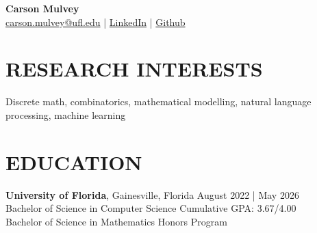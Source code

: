 \documentclass[a4paper,9pt]{extarticle}
\begin{document}
\pagestyle{fancy}
\renewcommand{\headrulewidth}{0pt}
\fancyhead{}
\thispagestyle{empty} %

\begin{flushleft}
\textbf{\LARGE Carson Mulvey}\\[2pt] %
\href{mailto:carson.mulvey@ufl.edu}{carson.mulvey@ufl.edu} | \href{https://www.linkedin.com/in/carson-mulvey}{LinkedIn} | \href{https://github.com/heyuncle}{Github} %
\end{flushleft}

\section*{RESEARCH INTERESTS}
\noindent
Discrete math, combinatorics, mathematical modelling, natural language processing, machine learning
\section*{EDUCATION}
\noindent
\textbf{University of Florida}, Gainesville, Florida \hfill August 2022 | May 2026\\ %
Bachelor of Science in Computer Science \hfill Cumulative GPA: 3.67/4.00 \\
Bachelor of Science in Mathematics \hfill Honors Program

\end{document}
